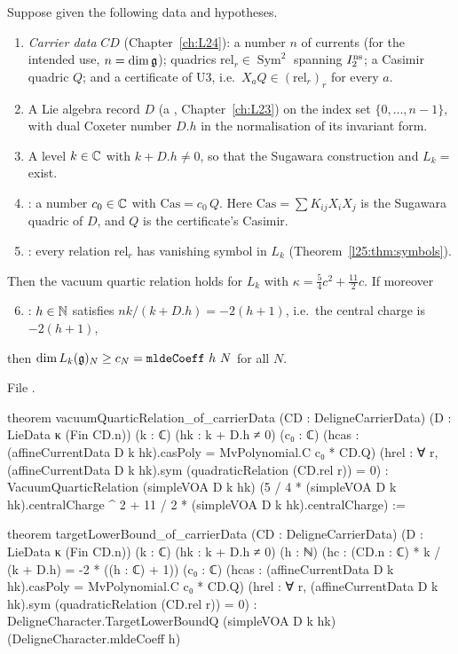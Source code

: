 \begin{theorem}\label{l25:thm:carrierdata}
Suppose given the following data and hypotheses.
\begin{enumerate}
\item \emph{Carrier data} $CD$ (Chapter~\ref{ch:L24}): a number $n$ of currents (for the intended use,
  $n=\dim\mathfrak g$); quadrics $\mathrm{rel}_r\in\operatorname{Sym}^2$ spanning $I_2^{\rm ns}$; a Casimir quadric $Q$;
  and a certificate of U3, i.e.\ $X_aQ\in(\mathrm{rel}_r)_r$ for every $a$.
\item A Lie algebra record $D$ (a , Chapter~\ref{ch:L23}) on the index set $\{0,\dots,n-1\}$, with dual
  Coxeter number $D.h$ in the normalisation of its invariant form.
\item A level $k\in{\mathbb{C}}$ with $k+D.h\ne0$, so that the Sugawara construction and $L_k=$ exist.
\item {}: a number $c_0\in{\mathbb{C}}$ with $\mathrm{Cas}=c_0\,Q$. Here $\mathrm{Cas}=\sum K_{ij}X_iX_j$ is the Sugawara
  quadric of $D$, and $Q$ is the certificate's Casimir.
\item {}: every relation $\mathrm{rel}_r$ has vanishing symbol in $L_k$ (Theorem~\ref{l25:thm:symbols}).
\end{enumerate}
Then the vacuum quartic relation holds for $L_k$ with $\kappa=\frac54c^2+\frac{11}2c$. If moreover
\begin{enumerate}\setcounter{enumi}{5}
\item {}: $h\in{\mathbb{N}}$ satisfies $nk/(k+D.h)=-2(h+1)$, i.e.\ the central charge is $-2(h+1)$,
\end{enumerate}
then $\dim L_k(\mathfrak g)_N\ge c_N=\mathtt{mldeCoeff}\ h\ N$ for all $N$.
\end{theorem}
\noindent File .
\begin{leancode}
theorem vacuumQuarticRelation_of_carrierData (CD : DeligneCarrierData) (D : LieData κ (Fin CD.n))
    (k : ℂ) (hk : k + D.h ≠ 0) (c₀ : ℂ)
    (hcas : (affineCurrentData D k hk).casPoly = MvPolynomial.C c₀ * CD.Q)
    (hrel : ∀ r, (affineCurrentData D k hk).sym (quadraticRelation (CD.rel r)) = 0) :
    VacuumQuarticRelation (simpleVOA D k hk)
      (5 / 4 * (simpleVOA D k hk).centralCharge ^ 2 + 11 / 2 * (simpleVOA D k hk).centralCharge) :=

theorem targetLowerBound_of_carrierData (CD : DeligneCarrierData) (D : LieData κ (Fin CD.n))
    (k : ℂ) (hk : k + D.h ≠ 0) (h : ℕ)
    (hc : (CD.n : ℂ) * k / (k + D.h) = -2 * ((h : ℂ) + 1)) (c₀ : ℂ)
    (hcas : (affineCurrentData D k hk).casPoly = MvPolynomial.C c₀ * CD.Q)
    (hrel : ∀ r, (affineCurrentData D k hk).sym (quadraticRelation (CD.rel r)) = 0) :
    DeligneCharacter.TargetLowerBoundQ (simpleVOA D k hk) (DeligneCharacter.mldeCoeff h)
\end{leancode}
